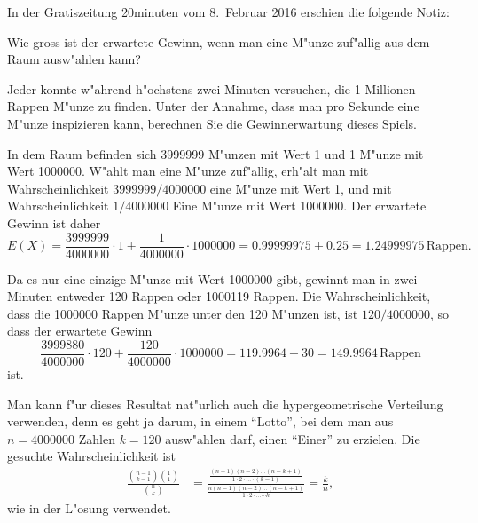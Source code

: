 In der Gratiszeitung 20minuten vom 8.~Februar 2016 erschien die folgende
Notiz:
\begin{center}
\end{center}
\begin{teilaufgaben}
\item Wie gross ist der erwartete Gewinn, wenn man eine M"unze zuf"allig
aus dem Raum ausw"ahlen kann?
\item
Jeder konnte w"ahrend h"ochstens zwei Minuten versuchen, die 1-Millionen-Rappen
M"unze zu finden. 
Unter der Annahme, dass man pro Sekunde eine M"unze inspizieren kann, 
berechnen Sie die Gewinnerwartung dieses Spiels.
\end{teilaufgaben}

\begin{loesung}
\begin{teilaufgaben}
\item
In dem Raum befinden sich 3999999 M"unzen mit Wert 1 und 1 M"unze mit
Wert 1000000.
W"ahlt man eine M"unze zuf"allig, erh"alt man mit Wahrscheinlichkeit
$3999999/4000000$ eine M"unze mit Wert 1, und mit Wahrscheinlichkeit
$1/4000000$ Eine M"unze mit Wert 1000000.
Der erwartete Gewinn ist daher
\[
E(X) = \frac{3999999}{4000000}\cdot 1 + \frac{1}{4000000}\cdot 1000000
=0.99999975 + 0.25 = 1.24999975\,\text{Rappen}.
\]
\item
Da es nur eine einzige M"unze mit Wert 1000000 gibt, gewinnt man
in zwei Minuten entweder 120 Rappen oder 1000119 Rappen.
Die Wahrscheinlichkeit, dass die 1000000 Rappen M"unze unter den
120 M"unzen ist, ist $120/4000000$, so dass der erwartete Gewinn
\[
\frac{3999880}{4000000}\cdot 120
+
\frac{120}{4000000}\cdot 1000000
=
119.9964 + 30=149.9964\,\text{Rappen}
\]
ist.
\end{teilaufgaben}
\end{loesung}

\begin{diskussion}
Man kann f"ur dieses Resultat nat"urlich auch die hypergeometrische
Verteilung verwenden, denn es geht ja darum, in einem ``Lotto'', bei dem
man aus $n=4000000$ Zahlen $k=120$ ausw"ahlen darf, einen ``Einer''
zu erzielen.
Die gesuchte Wahrscheinlichkeit ist
\begin{align*}
\frac{\displaystyle\binom{n-1}{k-1}\binom{1}{1}}{\displaystyle\binom{n}{k}}
&=
\frac{\displaystyle\frac{(n-1)(n-2)\dots(n-k+1)}{1\cdot 2\cdot\dots\cdot (k-1)}}%
{\displaystyle\frac{n(n-1)(n-2)\dots(n-k+1)}{1\cdot 2\cdot\dots\cdots k}}
=\frac{k}{n},
\end{align*}
wie in der L"osung verwendet.
\end{diskussion}

